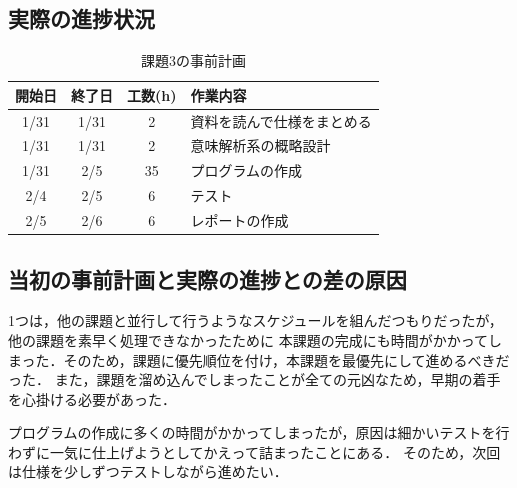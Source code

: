 \documentclass{jlreq}
\begin{document}
\subsection{実際の進捗状況}
\begin{table}[H]
  \centering
  \caption{課題3の事前計画}
  \begin{tabular}{cccp{10cm}}
    \hline
    開始日 & 終了日 & 工数(h) & 作業内容                   \\ \hline
    1/31   & 1/31   & 2       & 資料を読んで仕様をまとめる \\
    1/31   & 1/31   & 2       & 意味解析系の概略設計       \\
    1/31   & 2/5    & 35      & プログラムの作成           \\
    2/4    & 2/5    & 6       & テスト                     \\
    2/5    & 2/6    & 6       & レポートの作成             \\ \hline
  \end{tabular}
\end{table}

\subsection{当初の事前計画と実際の進捗との差の原因}
1つは，他の課題と並行して行うようなスケジュールを組んだつもりだったが，他の課題を素早く処理できなかったために
本課題の完成にも時間がかかってしまった．そのため，課題に優先順位を付け，本課題を最優先にして進めるべきだった．
また，課題を溜め込んでしまったことが全ての元凶なため，早期の着手を心掛ける必要があった．

プログラムの作成に多くの時間がかかってしまったが，原因は細かいテストを行わずに一気に仕上げようとしてかえって詰まったことにある．
そのため，次回は仕様を少しずつテストしながら進めたい．
\end{document}
